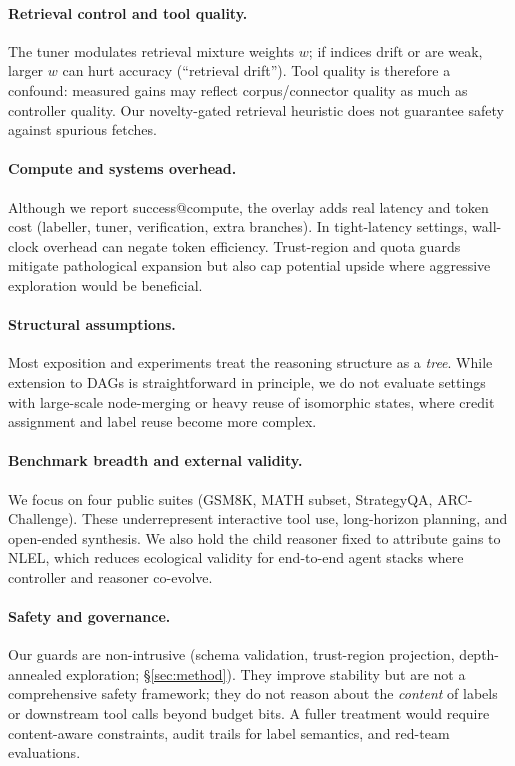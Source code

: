 \documentclass{article}
\theoremstyle{plain}
\theoremstyle{definition}
\theoremstyle{remark}
\begin{document}
\paragraph{Retrieval control and tool quality.}
The tuner modulates retrieval mixture weights $w$; if indices drift or are weak, larger $w$ can hurt accuracy (``retrieval drift''). Tool quality is therefore a confound: measured gains may reflect corpus/connector quality as much as controller quality. Our novelty-gated retrieval heuristic does not guarantee safety against spurious fetches.

\paragraph{Compute and systems overhead.}
Although we report success@compute, the overlay adds real latency and token cost (labeller, tuner, verification, extra branches). In tight-latency settings, wall-clock overhead can negate token efficiency. Trust-region and quota guards mitigate pathological expansion but also cap potential upside where aggressive exploration would be beneficial.

\paragraph{Structural assumptions.}
Most exposition and experiments treat the reasoning structure as a \emph{tree}. While extension to DAGs is straightforward in principle, we do not evaluate settings with large-scale node-merging or heavy reuse of isomorphic states, where credit assignment and label reuse become more complex.

\paragraph{Benchmark breadth and external validity.}
We focus on four public suites (GSM8K, MATH subset, StrategyQA, ARC-Challenge). These underrepresent interactive tool use, long-horizon planning, and open-ended synthesis. We also hold the child reasoner fixed to attribute gains to NLEL, which reduces ecological validity for end-to-end agent stacks where controller and reasoner co-evolve.

\paragraph{Safety and governance.}
Our guards are non-intrusive (schema validation, trust-region projection, depth-annealed exploration; \S\ref{sec:method}). They improve stability but are not a comprehensive safety framework; they do not reason about the \emph{content} of labels or downstream tool calls beyond budget bits. A fuller treatment would require content-aware constraints, audit trails for label semantics, and red-team evaluations.
\end{document}
